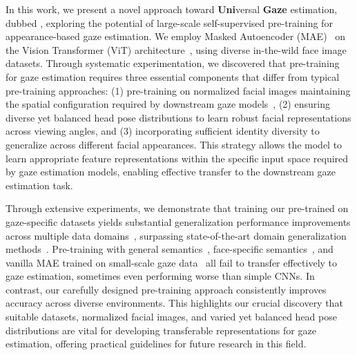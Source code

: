 In this work, we present a novel approach toward \textbf{Uni}versal \textbf{Gaze} estimation, dubbed \methodname, exploring the potential of large-scale self-supervised pre-training for appearance-based gaze estimation. 
We employ Masked Autoencoder (MAE)~\cite{he2022masked} on the Vision Transformer (ViT) architecture~\cite{dosovitskiy2020vit}, using diverse in-the-wild face image datasets.
Through systematic experimentation, we discovered that pre-training for gaze estimation requires three essential components that differ from typical pre-training approaches: 
(1) pre-training on normalized facial images maintaining the spatial configuration required by downstream gaze models~\cite{zhang2018revisiting}, 
(2) ensuring diverse yet balanced head pose distributions to learn robust facial representations across viewing angles, and 
(3) incorporating sufficient identity diversity to generalize across different facial appearances.
This strategy allows the model to learn appropriate feature representations within the specific input space required by gaze estimation models, enabling effective transfer to the downstream gaze estimation task.



Through extensive experiments, we demonstrate that training our pre-trained \methodname on gaze-specific datasets yields substantial generalization performance improvements across multiple data domains~\cite{zhang2020eth,mpii_zhang19_pami,funes2014eyediap,krafka2016eye,kellnhofer2019gaze360}, surpassing state-of-the-art domain generalization methods~\cite{cheng2022puregaze,xu2023learning,bao2024feature,yin2024clip,yin2024lggaze,zhao2024improving}.
Pre-training with general semantics~\cite{zhou2024deformable,caron2021emerging,chen2021empirical}, face-specific semantics~\cite{zheng2022general}, and vanilla MAE trained on small-scale gaze data~\cite{jiang2024learning} all fail to transfer effectively to gaze estimation, sometimes even performing worse than simple CNNs.
In contrast, our carefully designed pre-training approach consistently improves accuracy across diverse environments.
This highlights our crucial discovery that suitable datasets, normalized facial images, and varied yet balanced head pose distributions are vital for developing transferable representations for gaze estimation, offering practical guidelines for future research in this field.


